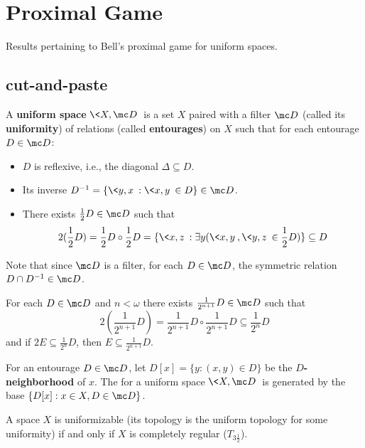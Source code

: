 
\chapter{Proximal Game}

Results pertaining to Bell's proximal game for uniform spaces.

\section{cut-and-paste}


\begin{defn}
  A \textbf{uniform space} $\<X,\mc D\>$ is a set $X$ paired with a filter $\mc D$ (called its \textbf{uniformity}) of relations (called \textbf{entourages}) on $X$ such that for each entourage $D\in \mc D$:
    \begin{itemize}
      \item $D$ is reflexive, i.e., the diagonal $\Delta\subseteq D$.
      \item Its inverse $D^{-1}=\{\<y,x\>:\<x,y\>\in D\}\in \mc D$.
      \item There exists $\frac{1}{2}D\in\mc D$ such that 
        \[
          2(\frac{1}{2}D)=\frac{1}{2}D\circ\frac{1}{2}D=\{\<x,z\>:\exists y(\<x,y\>,\<y,z\>\in\frac{1}{2}D)\}\subseteq D
        \]
    \end{itemize}
  Note that since $\mc D$ is a filter, for each $D\in\mc D$, the symmetric relation $D\cap D^{-1}\in \mc D$.
\end{defn}

\begin{prop}
For each $D\in\mc D$ and $n<\omega$ there exists $\frac{1}{2^{n+1}}D\in\mc D$ such that 
  \[2(\frac{1}{2^{n+1}}D)=\frac{1}{2^{n+1}}D\circ \frac{1}{2^{n+1}}D\subseteq \frac{1}{2^{n}}D\]
and if $2E\subseteq \frac{1}{2^{n}}D$, then $E\subseteq \frac{1}{2^{n+1}}D$.
\end{prop}

\begin{defn}
  For an entourage $D\in\mc D$, let $D[x]=\{y:(x,y)\in D\}$ be the \textbf{$D$-neighborhood} of $x$. The  for a uniform space $\<X,\mc D\>$ is generated by the base $\{D[x]:x\in X,D\in\mc D\}$.
\end{defn}

\begin{thm}
  A space $X$ is uniformizable (its topology is the uniform topology for some uniformity) if and only if $X$ is completely regular ($T_{3\frac{1}{2}}$).
\end{thm}

